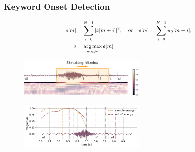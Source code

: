 \begin{frame}
  \frametitle{Keyword Onset Detection}
  \vspace{-1cm}
  \begin{equation*}
  \scriptsize
    \begin{aligned}
      e[m] &= \sum_{i=0}^{N-1} \abs{x[m + i]}^2, \quad \mathrm{or} \quad e[m] = \sum_{i=0}^{N-1} u_0[m + i],\\
      o &= \underset{m \in \mathcal{M}}{\arg \max} \, e[m]
    \end{aligned}
  \end{equation*}
  \begin{figure} \hspace{0.75cm} \includegraphics[width=0.55\textwidth]{../3_signal/figs/signal_onset_window.pdf} \end{figure}
  \begin{figure} \includegraphics[width=0.55\textwidth]{../3_signal/figs/signal_onset_showcase_right0.png} \end{figure}
\end{frame}